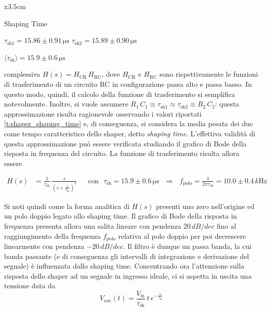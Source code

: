 \documentclass[a4paper,11pt]{article} %
\begin{document}
\begin{table}
	\small
	\centering
	\begin{tabular}{x{3.5cm}} 
		\toprule[0.5px]
		\toprule[0.1px]	
		
		Shaping Time \tn

		\midrule[0.1px]
		
		\addlinespace

		$\tau_{\text{sh}1} = 15.86 \pm 0.91 \,\si{\us}$ \tn
		$\tau_{\text{sh}2} = 15.89 \pm 0.90 \,\si{\us}$ \tn

		\addlinespace

		$\langle\tau_{\text{sh}}\rangle = 15.9 \pm 0.6 \,\si{\us}$ \tn


		\bottomrule[0.5px]		
	\end{tabular}
	\vspace{-5pt}
	\caption{\small Stime di $\tau_{\text{sh}}$.}
	\label{t:shaper_shaping_time}
\end{table}	

complessiva $H(s) = H_{\text{CR}} \, H_{\text{RC}}$, dove $H_{\text{CR}}$ e $H_{\text{RC}}$ sono rispettivamente le
funzioni di trasferimento di un circuito RC in configurazione passa alto e passa basso. In questo modo, quindi, il
calcolo della funzione di trasferimento si semplifica notevolmente. Inoltre, si vuole assumere $R_1 \, C_1 \equiv
\tau_{\text{sh}1} \approx \tau_{\text{sh2}} \equiv R_2 \, C_2$: questa approssimazione risulta ragionevole osservando i
valori riportati \autoref{t:shaper_shaping_time} e, di conseguenza, si considera la media pesata dei due come tempo
caratteristico dello shaper, detto \textit{shaping time}. L'effettiva validità di questa approssimazione può essere
verificata studiando il grafico di Bode della risposta in frequenza del circuito. La funzione di trasferimento risulta
allora essere

\begin{align}\label{e:shaper_H} 
	H(s) &= \frac{ 1 }{ \tau_{\text{sh} } }  \,  
	\frac{ s }{ \left( s + \frac{ 1 }{ \tau_{\text{sh} } } \right)^2}  
   	& 
   	&\text{con} \,\,\,\, \tau_{\text{sh}}= 15.9 \pm 0.6 \,\si{\us} 
   	\,\,\,\,\Longrightarrow\,\,\,\,
   	f_{\text{polo}}=\frac{1}{2\pi \tau_{\text{sh}}}= 10.0 \pm 0.4 \,\si{k\Hz}
\end{align}

Si noti quindi come la forma analitica di $H(s)$ presenti uno zero nell'origine ed un polo doppio legato allo shaping
time. Il grafico di Bode della risposta in frequenza presenta allora una salita lineare con pendenza $20\,\si{dB/dec}$
fino al raggiungimento della frequenza $f_{\text{polo}}$ relativa al polo doppio per poi decrescere linearmente con
pendenza $-20\,\si{dB/dec}$. Il filtro è dunque un passa banda, la cui banda passante (e di conseguenza gli intervalli
di integrazione e derivazione del segnale) è influenzata dallo shaping time. Concentrando ora l'attenzione sulla
risposta dello shaper ad un segnale in ingresso ideale, ci si aspetta in uscita una tensione data da 
\begin{equation} 
	V_{\text{out}}(t)=\frac{V_{\text{in}}}{\tau_{ \text{sh} }} \, t \,
	e^{-\frac{t}{\tau_{ \text{sh} } }} 
\end{equation} 
\end{document}
